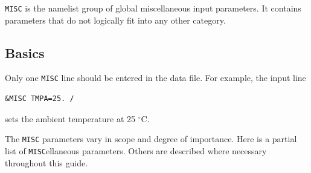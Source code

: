 \documentclass[11pt]{book}
\newcommand{\ct}{\tt\small}
\begin{document}
{\ct MISC} is the namelist group of global miscellaneous input parameters. It contains parameters that do not logically fit into any other category.

\subsection{Basics}

\label{info:MISC_Basics}

Only one {\ct MISC} line should be entered in the data file. For example, the input line

\footnotesize
\begin{verbatim}
&MISC TMPA=25. /
\end{verbatim}
\normalsize

\noindent
sets the ambient temperature at 25 $^\circ$C.

The {\ct MISC} parameters vary in scope and degree of importance. Here is a partial list of {\ct MISC}ellaneous parameters. Others are described where necessary throughout this
guide.
\end{document}
